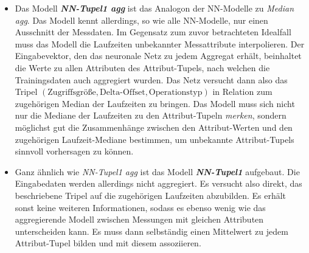 \documentclass[
	twoside,
	12pt,
	a4paper,
	BCOR10mm,
	DIV14,
	listof=totoc,
	bibliography=totoc,
	headsepline
]{scrreprt}
\begin{document}
\begin{itemize}
	\item Das Modell \textit{\textbf{NN-Tupel1 agg}} ist das Analogon der NN-Modelle zu \textit{Median agg}. Das Modell kennt allerdings, so wie alle NN-Modelle, nur einen Ausschnitt der Messdaten.
	Im Gegensatz zum zuvor betrachteten Idealfall muss das Modell die Laufzeiten unbekannter Messattribute interpolieren.
	Der Eingabevektor, den das neuronale Netz zu jedem Aggregat erhält, beinhaltet die Werte zu allen Attributen des Attribut-Tupels, nach welchen die Trainingsdaten auch aggregiert wurden.
	Das Netz versucht dann also das Tripel $(\mbox{Zugriffsgröße}, \mbox{Delta-Offset}, \mbox{Operationstyp})$ in Relation zum zugehörigen Median der Laufzeiten zu bringen.
	Das Modell muss sich nicht nur die Mediane der Laufzeiten zu den Attribut-Tupeln \textit{merken}, sondern möglichst gut die Zusammenhänge zwischen den Attribut-Werten und den zugehörigen Laufzeit-Mediane bestimmen, um unbekannte Attribut-Tupels sinnvoll vorhersagen zu können.
	\item Ganz ähnlich wie \textit{NN-Tupel1 agg} ist das Modell \textit{\textbf{NN-Tupel1}} aufgebaut. Die Eingabedaten werden allerdings nicht aggregiert.
	Es versucht also direkt, das beschriebene Tripel auf die zugehörigen Laufzeiten abzubilden. Es erhält sonst keine weiteren Informationen, sodass es ebenso wenig wie das aggregierende Modell zwischen Messungen mit gleichen Attributen unterscheiden kann.
	Es muss dann selbständig einen Mittelwert zu jedem Attribut-Tupel bilden und mit diesem assoziieren.
\end{itemize}
\end{document}

